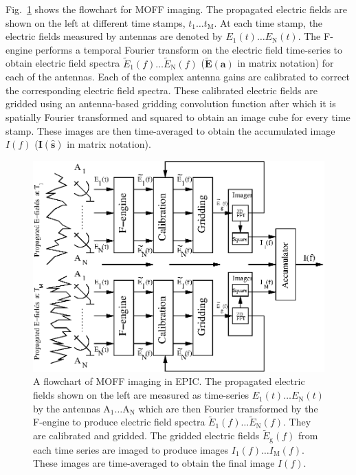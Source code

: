 \documentclass[a4paper,fleqn,usenatbib]{mnras}
\begin{document}
Fig.~\ref{fig:MOFF-flowchart} shows the flowchart for MOFF imaging. The
propagated electric fields are shown on the left at different time stamps,
$t_1\ldots t_\textrm{M}$. At each time stamp, the electric fields measured by
antennas are denoted by $E_1(t)\ldots E_\textrm{N}(t)$. The F-engine performs a
temporal Fourier transform on the electric field time-series to obtain electric
field spectra $\widetilde{E}_1(f)\ldots \widetilde{E}_\textrm{N}(f)$ 
($\widetilde{\mathbf{E}}(\mathbf{a})$ in matrix notation) for each of the 
antennas. Each of the complex antenna gains are calibrated to correct the 
corresponding electric field spectra. These calibrated electric fields are 
gridded using an antenna-based gridding convolution function after which it is 
spatially Fourier transformed and squared to obtain an image cube for every time 
stamp. These images are then time-averaged to obtain the accumulated image 
$I(f)$ ($\mathbf{I}(\hat{\mathbf{s}})$ in matrix notation).
\begin{figure}
  \includegraphics[width=\columnwidth]{figure1}
  \caption{A flowchart of MOFF imaging in EPIC. The propagated electric fields
    shown on the left are measured as time-series $E_1(t)\ldots E_\textrm{N}(t)$
    by the antennas $\textrm{A}_1\ldots \textrm{A}_\textrm{N}$ which are then 
    Fourier transformed by the F-engine to produce electric field spectra 
    $\widetilde{E}_1(f)\ldots \widetilde{E}_\textrm{N}(f)$. They are calibrated 
    and gridded. The gridded electric fields $\widetilde{E}_\textrm{g}(f)$ from 
    each time series are imaged to produce images 
    $I_1(f)\ldots I_\textrm{M}(f)$. These images are time-averaged to obtain the 
    final image $I(f)$.}
  \label{fig:MOFF-flowchart}
\end{figure}
\end{document}
